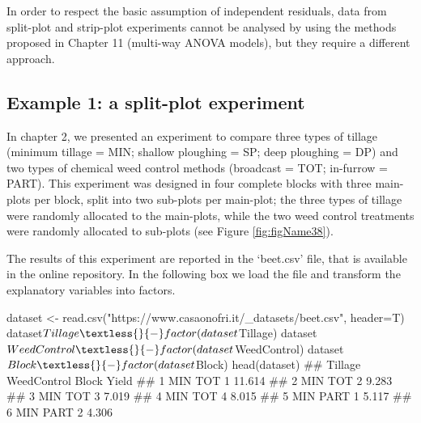 \documentclass[a4paper,12pt,oneside]{book}
\newenvironment{Shaded}{\begin{snugshade}}{\end{snugshade}}
\newcommand{\SpecialCharTok}[1]{#1}
\newcommand{\StringTok}[1]{#1}
\newcommand{\DocumentationTok}[1]{#1}
\newcommand{\OtherTok}[1]{#1}
\newcommand{\FunctionTok}[1]{#1}
\newcommand{\AttributeTok}[1]{#1}
\newcommand{\NormalTok}[1]{#1}
\begin{document}
In order to respect the basic assumption of independent residuals, data from split-plot and strip-plot experiments cannot be analysed by using the methods proposed in Chapter 11 (multi-way ANOVA models), but they require a different approach.

\hypertarget{example-1-a-split-plot-experiment}{%
\subsection{Example 1: a split-plot experiment}\label{example-1-a-split-plot-experiment}}

In chapter 2, we presented an experiment to compare three types of tillage (minimum tillage = MIN; shallow ploughing = SP; deep ploughing = DP) and two types of chemical weed control methods (broadcast = TOT; in-furrow = PART). This experiment was designed in four complete blocks with three main-plots per block, split into two sub-plots per main-plot; the three types of tillage were randomly allocated to the main-plots, while the two weed control treatments were randomly allocated to sub-plots (see Figure \ref{fig:figName38}).

The results of this experiment are reported in the `beet.csv' file, that is available in the online repository. In the following box we load the file and transform the explanatory variables into factors.

\begin{Shaded}
\begin{Highlighting}[]
\NormalTok{dataset }\OtherTok{\textless{}{-}} \FunctionTok{read.csv}\NormalTok{(}\StringTok{"https://www.casaonofri.it/\_datasets/beet.csv"}\NormalTok{, }\AttributeTok{header=}\NormalTok{T)}
\NormalTok{dataset}\SpecialCharTok{$}\NormalTok{Tillage }\OtherTok{\textless{}{-}} \FunctionTok{factor}\NormalTok{(dataset}\SpecialCharTok{$}\NormalTok{Tillage)}
\NormalTok{dataset}\SpecialCharTok{$}\NormalTok{WeedControl }\OtherTok{\textless{}{-}} \FunctionTok{factor}\NormalTok{(dataset}\SpecialCharTok{$}\NormalTok{WeedControl)}
\NormalTok{dataset}\SpecialCharTok{$}\NormalTok{Block }\OtherTok{\textless{}{-}} \FunctionTok{factor}\NormalTok{(dataset}\SpecialCharTok{$}\NormalTok{Block)}
\FunctionTok{head}\NormalTok{(dataset)}
\DocumentationTok{\#\#   Tillage WeedControl Block  Yield}
\DocumentationTok{\#\# 1     MIN         TOT     1 11.614}
\DocumentationTok{\#\# 2     MIN         TOT     2  9.283}
\DocumentationTok{\#\# 3     MIN         TOT     3  7.019}
\DocumentationTok{\#\# 4     MIN         TOT     4  8.015}
\DocumentationTok{\#\# 5     MIN        PART     1  5.117}
\DocumentationTok{\#\# 6     MIN        PART     2  4.306}
\end{Highlighting}
\end{Shaded}
\end{document}

